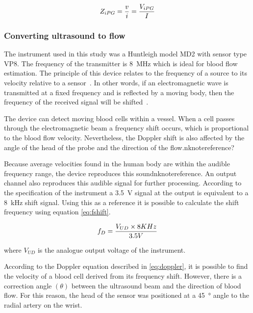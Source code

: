\begin{align}
	\label{eq:zipg}
	Z_{iPG}=\frac{v}{i} = \frac{V_{iPG}}{I} \tagaddtext{[\si{\ohm}]}
\end{align}

\subsubsection{Converting ultrasound to flow}
\label{sectionUD}
The instrument used in this study was a Huntleigh model MD2 with sensor type VP8. The frequency of the transmitter is \SI{8}{\mega\hertz} which is ideal for blood flow estimation. The principle of this device relates to the frequency of a source to its velocity relative to a sensor~\cite{surgeonhand2002Hand}.  In other words, if an electromagnetic wave is transmitted at a fixed frequency and is reflected by a moving body, then the frequency of the received signal will be shifted~\cite{ht:MD2}.  

The device can detect moving blood cells within a vessel.  When a cell passes through the electromagnetic beam a frequency shift occurs, which is proportional to the blood flow velocity. Nevertheless, the Doppler shift is also affected by the angle of the head of the probe and the direction of the flow.nknote{reference?}

Because average velocities found in the human body are within the audible frequency range, the device reproduces this soundnknote{reference}. An output channel also reproduces this audible signal for further processing. According to the specification of the instrument a \SI{3.5}{\volt} signal at the output is equivalent to a \SI{8}{\kilo\hertz} shift signal. Using this as a reference it is possible to calculate the shift frequency using equation \ref{eq:fshift}.

\begin{align}
	\label{eq:fshift}
	f_D = \frac{V_{UD} \times 8 KHz}{3.5V} \tagaddtext{[\si{\hertz}]}
\end{align}  

where $V_{UD}$ is the analogue output voltage of the instrument. 

According to the Doppler equation described in \ref{eq:doppler}, it is possible to find the velocity of a blood cell derived from its frequency shift. However, there is a correction angle $(\theta)$ between the ultrasound beam and the direction of blood flow. For this reason, the head of the sensor was positioned at a \SI{45}{\degree} angle to the radial artery on the wrist.

